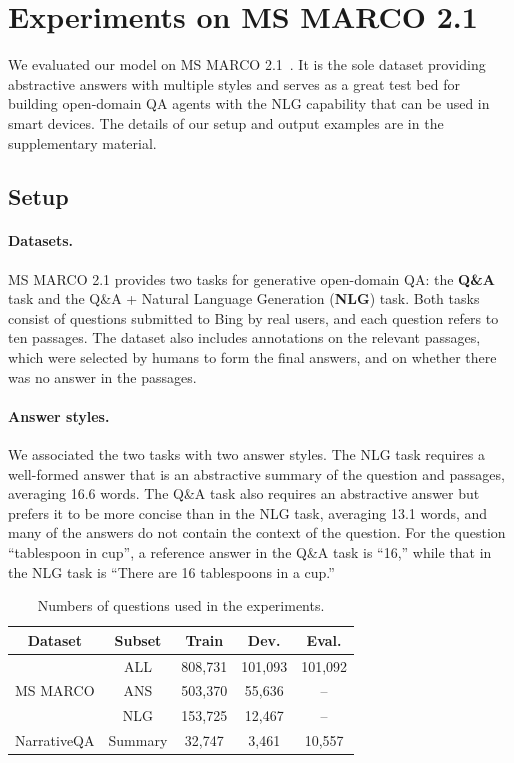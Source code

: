 \documentclass[11pt,a4paper]{article}
\theoremstyle{mydef}
\theoremstyle{myprob}
\begin{document}
\section{Experiments on MS MARCO 2.1}

We evaluated our model on MS MARCO 2.1~\cite{Bajaj18}. 
It is the sole dataset providing abstractive answers with multiple styles and serves as a great test bed for building open-domain QA agents with the NLG capability that can be used in smart devices.
The details of our setup and output examples are in the supplementary material.

\subsection{Setup} 

\paragraph{Datasets.}
MS MARCO 2.1 provides two tasks for generative open-domain QA:
the \textbf{Q\&A} task and the Q\&A + Natural Language Generation (\textbf{NLG}) task.
Both tasks consist of questions submitted to Bing by real users, and each question refers to ten passages.
The dataset also includes annotations on the relevant passages, which were selected by humans to form the final answers, and on whether there was no answer in the passages.

\paragraph{Answer styles.}
We associated the two tasks with two answer styles.
The NLG task requires a well-formed answer that is an abstractive summary of the question and passages, averaging 16.6 words.
The Q\&A task also requires an abstractive answer but prefers 
it to be
more concise 
than in the NLG task, averaging 13.1 words, and many of the answers do not contain the context of the question.
For the question ``tablespoon in cup'', 
a reference answer in the Q\&A task is ``16,'' while 
that in the NLG task is ``There are 16 tablespoons in a cup.''


\begin{table}[t!]
\centering
{\small \tabcolsep=4.5pt
\begin{tabular}{c|c|ccc}
\hline
Dataset & Subset   & Train & Dev. & Eval. \\ \hline
             & ALL & 808,731 & 101,093 & 101,092\\
MS MARCO & ANS & 503,370 & 55,636 & --\\
             & NLG & 153,725 & 12,467 & --\\ \hline
NarrativeQA & Summary & 32,747 & 3,461 & 10,557 \\ \hline             
\end{tabular} \\
}
\caption{Numbers of questions used in the experiments.}
\label{tb:data}
\end{table}
\end{document}
